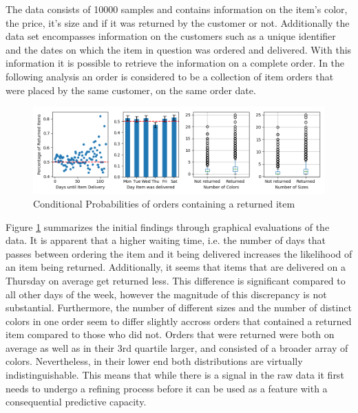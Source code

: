 The data consists of 10000 samples and contains information on the item's color, the price, it's size and if it was returned by the customer or not. Additionally the data set encompasses information on the customers such as a unique identifier and the dates on which the item in question was ordered and delivered. With this information it is possible to retrieve the information on a complete order. In the following analysis an order is considered to be a collection of item orders that were placed by the same customer, on the same order date.

\begin{figure}
\centering
\caption{Conditional Probabilities of orders containing a returned item}
\label{exploratory}
\includegraphics[scale=0.45]{../eda/exploratory.png}
\end{figure}

Figure \ref{exploratory} summarizes the initial findings through graphical evaluations of the data. It is apparent that a higher waiting time, i.e. the number of days that passes between ordering the item and it being delivered increases the likelihood of an item being returned. Additionally, it seems that items that are delivered on a Thursday on average get returned less. This difference is significant compared to all other days of the week, however the magnitude of this discrepancy is not substantial. Furthermore, the number of different sizes and the number of distinct colors in one order seem to differ slightly accross orders that contained a returned item compared to those who did not. Orders that were returned were both on average as well as in their 3rd quartile larger, and consisted of a broader array of colors. Nevertheless, in their lower end both distributions are virtually indistinguishable. This means that while there is a signal in the raw data it first needs to undergo a refining process before it can be used as a feature with a consequential predictive capacity. 

